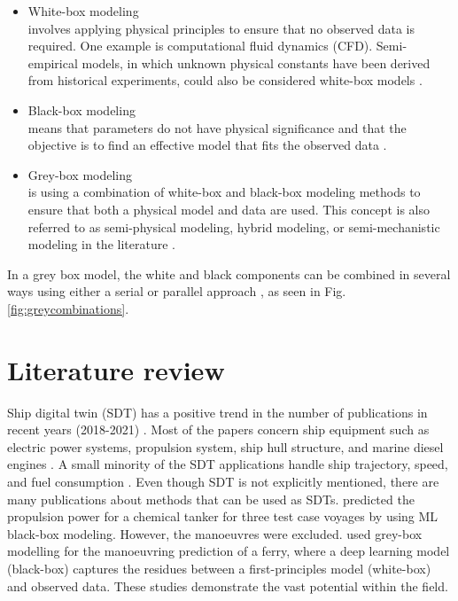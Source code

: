 \begin{itemize}
    \item White-box modeling \\
    involves applying physical principles to ensure that no observed data is required. One example is computational fluid dynamics (CFD). Semi-empirical models, in which unknown physical constants have been derived from historical experiments, could also be considered white-box models \cite{leifsson_grey-box_2008}.  

    \item Black-box modeling \\
    means that parameters do not have physical significance and that the objective is to find an effective model that fits the observed data \cite{lindskog_tools_1995}.
    
    \item Grey-box modeling \\
    is using a combination of white-box and black-box modeling methods to ensure that both a physical model and data are used. This concept is also referred to as semi-physical modeling, hybrid modeling, or semi-mechanistic modeling in the literature \cite{leifsson_grey-box_2008}. 
\end{itemize}

\noindent In a grey box model, the white and black components can be combined in several ways using either a serial or parallel approach \cite{leifsson_grey-box_2008}, as seen in Fig.\ref{fig:greycombinations}. 



\section{Literature review}
Ship digital twin (SDT) has a positive trend in the number of publications in recent years (2018-2021)  \cite{assani_ships_2022}. Most of the papers concern ship equipment such as electric power systems, propulsion system, ship hull structure, and marine diesel engines \cite{assani_ships_2022}. A small minority of the SDT applications handle ship trajectory, speed, and fuel consumption \cite{assani_ships_2022}.   
Even though SDT is not explicitly mentioned, there are many publications about methods that can be used as SDTs. \cite{lang_comparison_2022} predicted the propulsion power for a chemical tanker for three test case voyages by using ML black-box modeling. However, the manoeuvres were excluded. \cite{nielsen_machine_2022} used grey-box modelling for the manoeuvring prediction of a ferry, where a deep learning model (black-box) captures the residues between a first-principles model (white-box) and observed data. These studies demonstrate the vast potential within the field.

